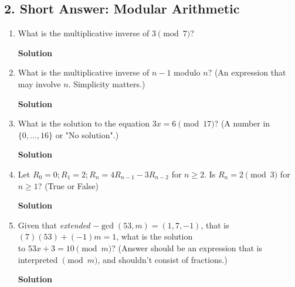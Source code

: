\documentclass{article}\usepackage{amsmath,amssymb,amsthm,tikz,tkz-graph,color,chngpage,soul,hyperref,csquotes,graphicx,floatrow}\newcommand*{\QEDB}{\hfill\ensuremath{\square}}\newtheorem*{prop}{Proposition}\renewcommand{\theenumi}{\alph{enumi}}\usepackage[shortlabels]{enumitem}\usepackage[nobreak=true]{mdframed}\usetikzlibrary{matrix,calc}\MakeOuterQuote{"}\usepackage[margin=0.75in]{geometry}
\begin{document}
\subsection*{2. Short Answer: Modular Arithmetic}
\begin{enumerate}
\item What is the multiplicative inverse of $3\pmod 7$?
\begin{mdframed}
\textbf{Solution}

\end{mdframed}
\item What is the multiplicative inverse of $n-1$ modulo $n$? (An expression that may involve $n$. Simplicity matters.)
\begin{mdframed}
\textbf{Solution}

\end{mdframed}
\item What is the solution to the equation $3x=6\pmod {17}$? (A number in $\{0,\ldots,16\}$ or "No solution".)
\begin{mdframed}
\textbf{Solution}

\end{mdframed}
\item Let $R_0=0;R_1=2;R_n=4R_{n-1}-3R_{n-2}$ for $n\geqslant 2$. Is $R_n=2\pmod 3$ for $n\geqslant 1$? (True or False)
\begin{mdframed}
\textbf{Solution}

\end{mdframed}
\item Given that \textit{extended} $-\gcd(53,m)=(1,7,-1)$, that is $(7)(53)+(-1)m=1$, what is the solution \\ to $53x+3=10\pmod m$? (Answer should be an expression that is interpreted $\pmod m$, and shouldn't consist of fractions.)
\begin{mdframed}
\textbf{Solution}

\end{mdframed}
\end{enumerate}
\clearpage

\end{document}
